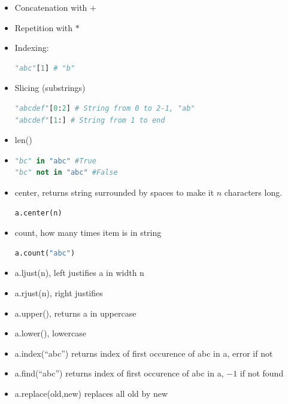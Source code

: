 \documentclass[12 pt]{article}
\begin{document}
\begin{itemize}
\item Concatenation with $+$
\item Repetition with $*$
\item Indexing:
\begin{lstlisting}[language=python]
"abc"[1] # "b"
\end{lstlisting}
\item Slicing (substrings)
\begin{lstlisting}[language=python]
"abcdef"[0:2] # String from 0 to 2-1, "ab"
"abcdef"[1:] # String from 1 to end
\end{lstlisting}
\item len()
\item
\begin{lstlisting}[language=python]
"bc" in "abc" #True
"bc" not in "abc" #False
\end{lstlisting}
\item center, returns string surrounded by spaces to make it $n$ characters long.
\begin{lstlisting}[language=python]
a.center(n)
\end{lstlisting}
\item count, how many times item is in string
\begin{lstlisting}[language=python]
a.count("abc")
\end{lstlisting}
\item a.ljust(n), left justifies a in width n
\item a.rjust(n), right justifies
\item a.upper(), returns a in uppercase
\item a.lower(), lowercase
\item a.index(``abc'') returns index of first occurence of abc in a, error if not
\item a.find(``abc'') returns index of first occurence of abc in a, $-1$ if not found
\item a.replace(old,new) replaces all old by new
\end{itemize}
\end{document}
